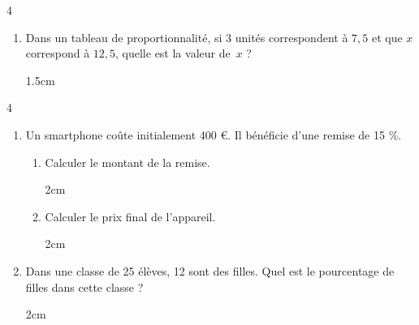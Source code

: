 \documentclass[a4paper]{book}
\begin{document}
{\begin{exerciceNote}{4}
\begin{enumerate}[leftmargin=*]
            \begin{ZoneReponse}{1.5cm}                
            \end{ZoneReponse}

            \item Dans un tableau de proportionnalité, si $3$ unités correspondent à $7,5$ et que $x$ correspond à $12,5$, quelle est la valeur de~$x$ ?

            \begin{ZoneReponse}{1.5cm}                
            \end{ZoneReponse}
        \end{enumerate}
    \end{exerciceNote}
    

    \begin{exerciceNote}{4}
        \begin{enumerate}[leftmargin=*]
            \item Un smartphone coûte initialement 400 €. Il bénéficie d'une remise de 15 \%.
            
            \begin{enumerate}[leftmargin=*]
                \item Calculer le montant de la remise. 

                \begin{ZoneReponse}{2cm}
                \end{ZoneReponse}

                \item Calculer le prix final de l'appareil.

                \begin{ZoneReponse}{2cm}
                \end{ZoneReponse}
            \end{enumerate}

            \item Dans une classe de 25 élèves, 12 sont des filles. Quel est le pourcentage de filles dans cette classe ?

            \begin{ZoneReponse}{2cm}
            \end{ZoneReponse}
        \end{enumerate}
    \end{exerciceNote}

}
\end{document}
